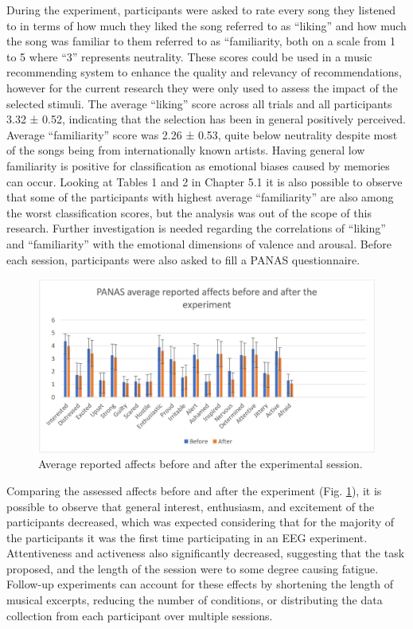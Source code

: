 During the experiment, participants were asked to rate every song they listened to in terms of how much they liked the song referred to as “liking” and how much the song was familiar to them referred to as “familiarity, both on a scale from 1 to 5 where “3” represents neutrality. These scores could be used in a music recommending system to enhance the quality and relevancy of recommendations, however for the current research they were only used to assess the impact of the selected stimuli. The average “liking” score across all trials and all participants 3.32 ± 0.52, indicating that the selection has been in general positively perceived. Average “familiarity” score was 2.26 ± 0.53, quite below neutrality despite most of the songs being from internationally known artists. Having general low familiarity is positive for classification as emotional biases caused by memories can occur. Looking at Tables 1 and 2 in Chapter 5.1 it is also possible to observe that some of the participants with highest average “familiarity” are also among the worst classification scores, but the analysis was out of the scope of this research. Further investigation is needed regarding the correlations of “liking” and “familiarity” with the emotional dimensions of valence and arousal. Before each session, participants were also asked to fill a PANAS questionnaire. 

\begin{figure}[h!]
\includegraphics[width=12cm]{img/discussion/panas.png}
\centering
\caption{Average reported affects before and after the experimental session.} \label{fig:panas}
\end{figure}
Comparing the assessed affects before and after the experiment (Fig. \ref{fig:panas}), it is possible to observe that general interest, enthusiasm, and excitement of the participants decreased, which was expected considering that for the majority of the participants it was the first time participating in an EEG experiment. Attentiveness and activeness also significantly decreased, suggesting that the task proposed, and the length of the session were to some degree causing fatigue. Follow-up experiments can account for these effects by shortening the length of musical excerpts, reducing the number of conditions, or distributing the data collection from each participant over multiple sessions.

